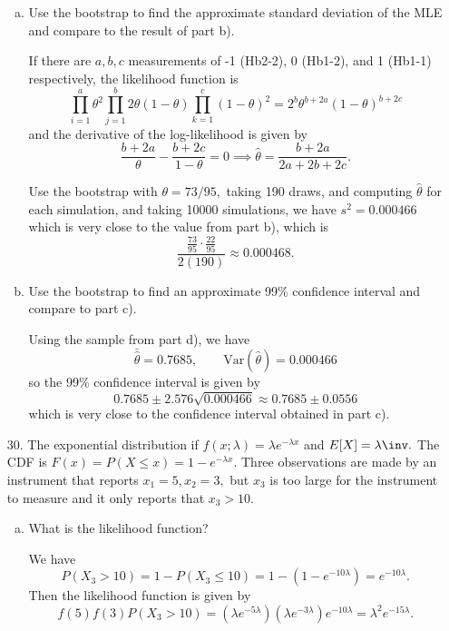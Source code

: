 \documentclass{article}
\newcommand{\var}{\mathrm{Var}}
\begin{document}
\begin{itemize}
\begin{enumerate}[a.]
			\item Use the bootstrap to find the approximate standard deviation of the MLE and compare to the result of part b).
				\begin{soln}
					If there are $a, b, c$ measurements of -1 (Hb2-2), 0 (Hb1-2), and 1 (Hb1-1) respectively, the likelihood function is \[\prod_{i=1}^{a} \theta^2\prod_{j=1}^{b}2\theta(1-\theta)\prod_{k=1}^{c}(1-\theta)^2=2^b \theta^{b+2a} (1-\theta)^{b+2c}\] and the derivative of the log-likelihood is given by \[\frac{b+2a}{\theta}-\frac{b+2c}{1-\theta}=0\implies \hat{\theta}=\frac{b+2a}{2a+2b+2c}.\] 

					Use the bootstrap with $\theta=73/95,$ taking 190 draws, and computing $\hat{\theta}$ for each simulation, and taking 10000 simulations, we have $s^2=0.000466$ which is very close to the value from part b), which is \[\frac{\frac{73}{95}\cdot\frac{22}{95}}{2(190)}\approx 0.000468.\]

				\end{soln}

			\item Use the bootstrap to find an approximate 99\% confidence interval and compare to part c).
				\begin{soln}
					Using the sample from part d), we have \[\bar{\hat{\theta}} = 0.7685, \quad\quad \var(\hat{\theta})=0.000466\] so the 99\% confidence interval is given by \[0.7685\pm 2.576\sqrt{0.000466}\approx 0.7685\pm 0.0556\] which is very close to the confidence interval obtained in part c).
					
				\end{soln}
				
		\end{enumerate}

		\newpage
	\item[30.] The exponential distribution if $f(x;\lambda)=\lambda e^{-\lambda x}$ and $E[X]=\lambda\inv.$ The CDF is $F(x)=P(X\le x)=1-e^{-\lambda x}.$ Three observations are made by an instrument that reports $x_1=5, x_2=3,$ but $x_3$ is too large for the instrument to measure and it only reports that $x_3>10.$

		\begin{enumerate}[a.]
			\item What is the likelihood function?
				\begin{soln}
					We have \[P(X_3>10)=1-P(X_3\le 10)=1-(1-e^{-10\lambda})=e^{-10\lambda}.\] Then the likelihood function is given by \[f(5)f(3)P(X_3>10)=(\lambda e^{-5\lambda})(\lambda e^{-3\lambda})e^{-10\lambda}=\lambda^2 e^{-15\lambda}.\]
					

\end{soln}
\end{enumerate}
\end{itemize}
\end{document}
